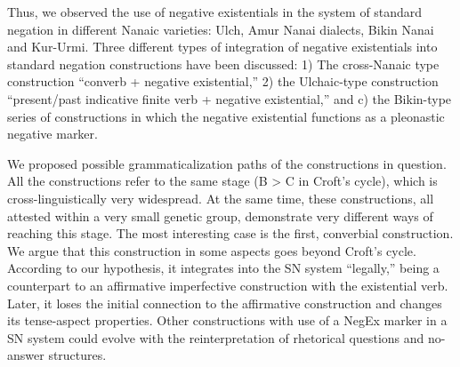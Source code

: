 \documentclass[output=paper]{langscibook}
\begin{document}
Thus, we observed the use of negative existentials in the system of standard negation in different Nanaic varieties: Ulch, Amur Nanai dialects, Bikin Nanai and Kur-Urmi. Three different types of integration of negative existentials into standard negation constructions have been discussed: 1) The cross-Nanaic type construction “converb + negative existential,” 2) the Ulchaic-type construction “present/past indicative finite verb + negative existential,” and c) the Bikin-type series of constructions in which the negative existential functions as a pleonastic negative marker.

We proposed possible grammaticalization paths of the constructions in question. All the constructions refer to the same stage (B > C in Croft’s cycle), which is cross-linguistically very widespread. At the same time, these constructions, all attested within a very small genetic group, demonstrate very different ways of reaching this stage. The most interesting case is the first, converbial construction. We argue that this construction in some aspects goes beyond Croft’s cycle. According to our hypothesis, it integrates into the SN system “legally,” being a counterpart to an affirmative imperfective construction with the existential verb. Later, it loses the initial connection to the affirmative construction and changes its tense-aspect properties. Other constructions with use of a NegEx marker in a SN system could evolve with the reinterpretation of rhetorical questions and no-answer structures.
\end{document}

